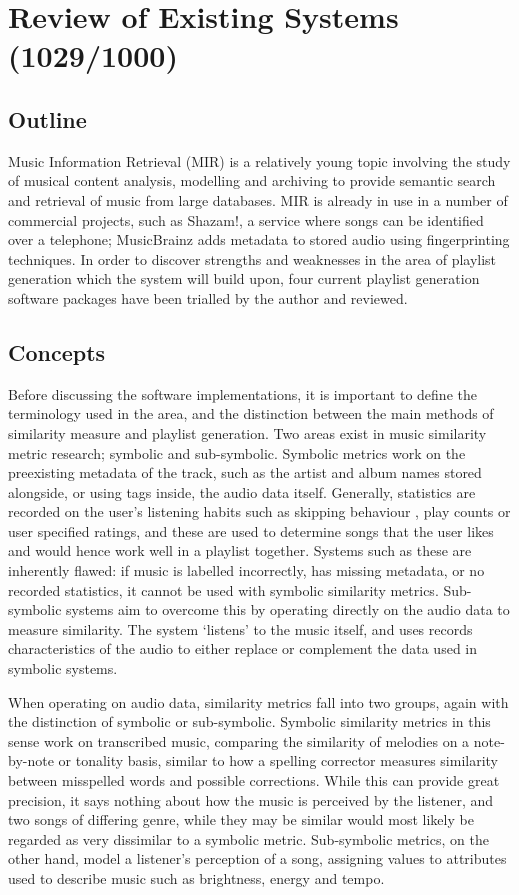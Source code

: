 \chapter{Review of Existing Systems (1029/1000)}
\section{Outline}
Music Information Retrieval (MIR) is a relatively young topic involving the study of musical content analysis, modelling and archiving to provide semantic search and retrieval of music from large databases. MIR is already in use in a number of commercial projects, such as Shazam!, a service where songs can be identified over a telephone; MusicBrainz adds metadata to stored audio using fingerprinting techniques. 
In order to discover strengths and weaknesses in the area of playlist generation which the system will build upon, four current playlist generation software packages have been trialled by the author and reviewed.
\section{Concepts}
Before discussing the software implementations, it is important to define the terminology used in the area, and the distinction between the main methods of similarity measure and playlist generation. Two areas exist in music similarity metric research; symbolic and sub-symbolic. Symbolic metrics work on the preexisting metadata of the track, such as the artist and album names stored alongside, or using  tags inside, the audio data itself. Generally, statistics are recorded on the user's listening habits such as skipping behaviour \citep{Pampalk2005a}, play counts or user specified ratings, and these are used to determine songs that the user likes and would hence work well in a playlist together. Systems such as these are inherently flawed: if music is labelled incorrectly, has missing metadata, or no recorded statistics, it cannot be used with symbolic similarity metrics. Sub-symbolic systems aim to overcome this by operating directly on the audio data to measure similarity. The system `listens' to the music itself, and uses records characteristics of the audio to either replace or complement the data used in symbolic systems.

When operating on audio data, similarity metrics fall into two groups, again with the distinction of symbolic or sub-symbolic. Symbolic similarity metrics in this sense work on transcribed music, comparing the similarity of melodies on a note-by-note or tonality basis, similar to how a spelling corrector measures similarity between misspelled words and possible corrections. While this can provide great precision, it says nothing about how the music is perceived by the listener, and two songs of differing genre, while they may be similar would most likely be regarded as very dissimilar to a symbolic metric. Sub-symbolic metrics, on the other hand, model a listener's perception of a song, assigning values to attributes used to describe music such as brightness, energy and tempo.
